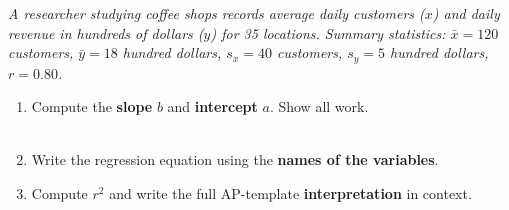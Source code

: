 \documentclass[10pt]{article}
\begin{document}
\namedateperiod

\vspace{0.18in}

\begin{tcolorbox}[colback=sky, colframe=navy, boxrule=0.9pt, arc=2mm,
    left=4mm, right=4mm, top=2.5mm, bottom=2.5mm]
\small\textit{A researcher studying coffee shops records average daily customers ($x$) and
daily revenue in hundreds of dollars ($y$) for 35 locations.
Summary statistics: $\bar{x} = 120$ customers, $\bar{y} = 18$ hundred dollars,
$s_x = 40$ customers, $s_y = 5$ hundred dollars, $r = 0.80$.}
\end{tcolorbox}

\vspace{0.16in}

\begin{enumerate}[leftmargin=1.6em, itemsep=0.16in]

  \item Compute the \textbf{slope} $b$ and \textbf{intercept} $a$. Show all work.\\[8pt]
        \\[3pt]

  \item Write the regression equation using the \textbf{names of the variables}.\\[8pt]

  \item Compute $r^2$ and write the full AP-template \textbf{interpretation} in context.\\[8pt]
        \\[3pt]
        \\[3pt]

\end{enumerate}

\vspace{0.14in}
\end{document}
